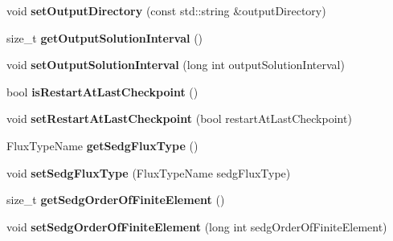 \begin{DoxyCompactItemize}
\item 
\hypertarget{classnatrium_1_1SolverConfiguration_acd249488bb83773514c4d6917b5bfc3a}{void {\bfseries set\-Output\-Directory} (const std\-::string \&output\-Directory)}\label{classnatrium_1_1SolverConfiguration_acd249488bb83773514c4d6917b5bfc3a}

\item 
\hypertarget{classnatrium_1_1SolverConfiguration_aa7fdb1358469be8faf1cc14c64538927}{size\-\_\-t {\bfseries get\-Output\-Solution\-Interval} ()}\label{classnatrium_1_1SolverConfiguration_aa7fdb1358469be8faf1cc14c64538927}

\item 
\hypertarget{classnatrium_1_1SolverConfiguration_ab49c72f19d58f7408eb14ac7fd865b78}{void {\bfseries set\-Output\-Solution\-Interval} (long int output\-Solution\-Interval)}\label{classnatrium_1_1SolverConfiguration_ab49c72f19d58f7408eb14ac7fd865b78}

\item 
\hypertarget{classnatrium_1_1SolverConfiguration_a6ca256e404b94f7201ecace9307ef1df}{bool {\bfseries is\-Restart\-At\-Last\-Checkpoint} ()}\label{classnatrium_1_1SolverConfiguration_a6ca256e404b94f7201ecace9307ef1df}

\item 
\hypertarget{classnatrium_1_1SolverConfiguration_af6077ef11412e53eb16c013b4362410e}{void {\bfseries set\-Restart\-At\-Last\-Checkpoint} (bool restart\-At\-Last\-Checkpoint)}\label{classnatrium_1_1SolverConfiguration_af6077ef11412e53eb16c013b4362410e}

\item 
\hypertarget{classnatrium_1_1SolverConfiguration_aecc2a87bc6e50d6e09ea035678478c4f}{Flux\-Type\-Name {\bfseries get\-Sedg\-Flux\-Type} ()}\label{classnatrium_1_1SolverConfiguration_aecc2a87bc6e50d6e09ea035678478c4f}

\item 
\hypertarget{classnatrium_1_1SolverConfiguration_a331256f91794e32be618b1162c321bdd}{void {\bfseries set\-Sedg\-Flux\-Type} (Flux\-Type\-Name sedg\-Flux\-Type)}\label{classnatrium_1_1SolverConfiguration_a331256f91794e32be618b1162c321bdd}

\item 
\hypertarget{classnatrium_1_1SolverConfiguration_a1fad5bbbc062b1aad018da73e90033b2}{size\-\_\-t {\bfseries get\-Sedg\-Order\-Of\-Finite\-Element} ()}\label{classnatrium_1_1SolverConfiguration_a1fad5bbbc062b1aad018da73e90033b2}

\item 
\hypertarget{classnatrium_1_1SolverConfiguration_a2a9ab8b6b6dcb47ad4bb85ef06e15dea}{void {\bfseries set\-Sedg\-Order\-Of\-Finite\-Element} (long int sedg\-Order\-Of\-Finite\-Element)}\label{classnatrium_1_1SolverConfiguration_a2a9ab8b6b6dcb47ad4bb85ef06e15dea}


\end{DoxyCompactItemize}
